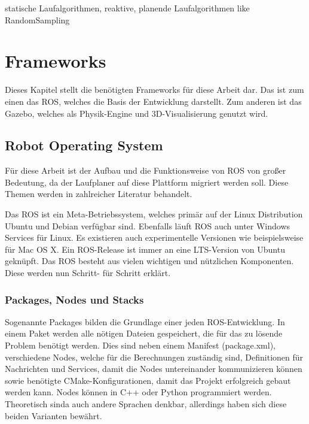 statische Laufalgorithmen, reaktive, planende Laufalgorithmen like RandomSampling

\section{Frameworks}

Dieses Kapitel stellt die benötigten Frameworks für diese Arbeit dar. Das ist zum einen das \ac{ROS}, welches die Basis der Entwicklung darstellt. Zum anderen ist das Gazebo, welches als Physik-Engine und 3D-Visualisierung genutzt wird.

\subsection{Robot Operating System}

Für diese Arbeit ist der Aufbau und die Funktionsweise von \ac{ROS} von großer Bedeutung, da der Laufplaner auf diese Plattform migriert werden soll. Diese Themen werden in zahlreicher Literatur behandelt. \autocite{rosAnOpenSourceRobotOperatingSystem} \autocite{learningROSForRoboticsProgramming} \autocite{gentleIntroductionToROS}

Das \ac{ROS} ist ein Meta-Betriebssystem, welches primär auf der Linux Distribution Ubuntu und Debian verfügbar sind. Ebenfalls läuft \ac{ROS} auch unter Windows Services für Linux. Es existieren auch experimentelle Versionen wie beispielsweise für Mac OS X. Ein ROS-Release ist immer an eine \ac{LTS}-Version von Ubuntu  geknüpft. Das \ac{ROS} besteht aus vielen wichtigen und nützlichen Komponenten. Diese werden nun Schritt- für Schritt erklärt.

\subsubsection{Packages, Nodes und Stacks}

Sogenannte Packages bilden die Grundlage einer jeden \ac{ROS}-Entwicklung. In einem Paket werden alle nötigen Dateien gespeichert, die für das zu lösende Problem benötigt werden. Dies sind neben einem Manifest (package.xml), verschiedene Nodes, welche für die Berechnungen zuständig sind, Definitionen für Nachrichten und Services, damit die Nodes untereinander kommunizieren können sowie benötigte CMake-Konfigurationen, damit das Projekt erfolgreich gebaut werden kann. Nodes können in C++ oder Python programmiert werden. Theoretisch sinda auch andere Sprachen denkbar, allerdings haben sich diese beiden Varianten bewährt.

